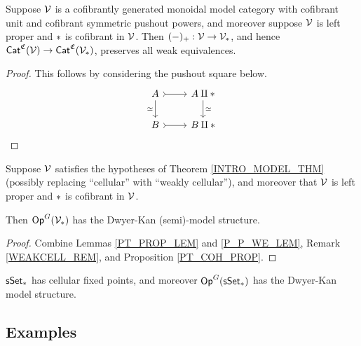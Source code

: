 \documentclass[a4paper,10pt
,draft
]{article}%
\renewcommand{\1}{\eta}%
\begin{document}
\begin{lemma}
      \label{P_P_WE_LEM}
      Suppose $\mathcal V$ is a cofibrantly generated monoidal model category with cofibrant unit and cofibrant symmetric pushout powers,
      and moreover suppose $\mathcal V$ is left proper and $\**$ is cofibrant in $\mathcal V$.
      Then $(-)_+: \V \to \V_{\**}$, and hence $\Cat^{\mathfrak C}(\V) \to \Cat^{\mathfrak C}(\V_{\**})$, preserves all weak equivalences.
\end{lemma}
\begin{proof}
      This follows by considering the pushout square below.
      \begin{equation}
            \begin{tikzcd}
                  A \arrow[r, rightarrowtail] \arrow[d, "\simeq"']
                  &
                  A \amalg \** \arrow[d, "\simeq"]
                  \\
                  B \arrow[r, rightarrowtail]
                  &
                  B \amalg \**
            \end{tikzcd}
      \end{equation}
\end{proof}

\begin{corollary}
      \label{PT_MODEL_COR}
      Suppose $\mathcal V$ satisfies the hypotheses of Theorem \ref{INTRO_MODEL_THM}
      (possibly replacing ``cellular'' with ``weakly cellular''),
      and moreover that $\mathcal V$ is left proper and $\**$ is cofibrant in $\mathcal V$.

      Then $\Op^G(\V_{\**})$ has the Dwyer-Kan (semi)-model structure.
\end{corollary}
\begin{proof}
      Combine Lemmas \ref{PT_PROP_LEM} and \ref{P_P_WE_LEM}, Remark \ref{WEAKCELL_REM}, and Proposition \ref{PT_COH_PROP}.
\end{proof}


\begin{corollary}
      \label{PTSSET_COR}
      $\sSet_{\**}$ has cellular fixed points, and moreover
      $\Op^G(\sSet_{\**})$ has the Dwyer-Kan model structure.
\end{corollary}






\subsection{Examples}
\end{document}
